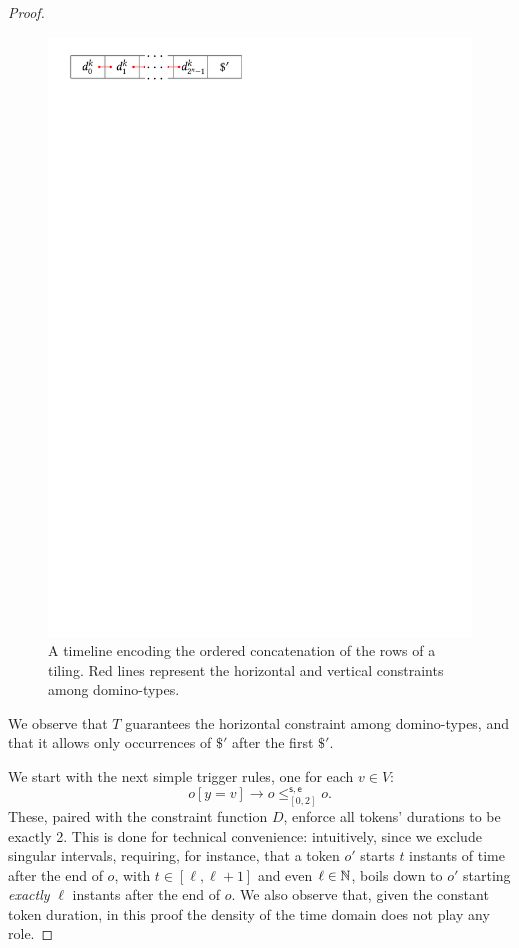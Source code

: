 \begin{proof}
\begin{figure}[tb]
    \includegraphics[scale=0.42]{Chaps/Timelines/row2.pdf}
    \caption{A timeline encoding the ordered concatenation of the rows of a tiling. Red lines represent the horizontal and vertical constraints among domino-types.}\label{fig:rowEXPhardTP}
\end{figure}

We observe that $T$ guarantees the horizontal constraint among domino-types, and that it allows only occurrences of $\$'$ after the first $\$'$. 

We start with the next simple trigger rules, one for each $v\in V$: 
\[o[y=v]\to o\leq^{\mathsf{s},\mathsf{e}}_{[0,2]} o.\] 
These, paired with the constraint function $D$, enforce
all tokens' durations to be exactly 2. This is done for technical convenience: intuitively, since we exclude singular intervals, requiring, for instance, that a token $o'$ starts  $t$ instants of time after the end of $o$, with $t\in [\ell,\ell+1]$ and even $\ell\in\mathbb{N}$, boils down to $o'$ starting \emph{exactly} $\ell$ instants after the end of $o$. We also observe that, given the constant token duration, in this proof the density of the time domain does not play any role.


\end{proof}
